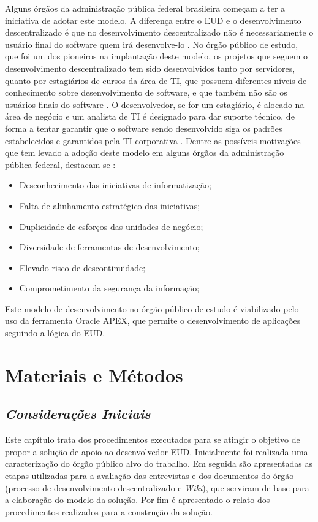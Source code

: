  Alguns órgãos da administração pública federal brasileira começam a ter a iniciativa de adotar este modelo. A diferença entre o EUD e o desenvolvimento descentralizado é que no desenvolvimento descentralizado não é necessariamente o usuário final do software quem irá desenvolve-lo \cite{artigoTcuGovTI}. No órgão público de estudo, que foi um dos pioneiros na implantação deste modelo, os projetos que seguem o desenvolvimento descentralizado tem sido desenvolvidos tanto por servidores, quanto por estagiários de cursos da área de TI, que possuem diferentes níveis de conhecimento sobre desenvolvimento de software, e que também não são os usuários finais do software \cite{artigoTcuGovTI}. O desenvolvedor, se for um estagiário, é alocado na área de negócio e um analista de TI é designado para dar suporte técnico, de forma a tentar garantir que o software sendo desenvolvido siga os padrões estabelecidos e garantidos pela TI corporativa \cite{artigoTcuGovTI}.
Dentre as possíveis motivações que tem levado a adoção deste modelo em alguns órgãos da administração pública federal, destacam-se \cite{slideTCU}:

\begin{itemize}
\item Desconhecimento das iniciativas de informatização;
\item Falta de alinhamento estratégico das iniciativas;
\item Duplicidade de esforços das unidades de negócio;
\item Diversidade de ferramentas de desenvolvimento;
\item Elevado risco de descontinuidade;
\item Comprometimento da segurança da informação;
\end{itemize}

Este modelo de desenvolvimento no órgão público de estudo é viabilizado pelo uso da ferramenta Oracle APEX, que permite o desenvolvimento de aplicações seguindo a lógica do EUD.
\clearpage

\chapter[Materiais e Métodos]{Materiais e Métodos}

\section{\textit{Considerações Iniciais}}


Este capítulo trata dos procedimentos executados para se atingir o objetivo de propor a solução de apoio ao desenvolvedor EUD. Inicialmente foi realizada uma caracterização do órgão público alvo do trabalho. Em seguida são apresentadas as etapas utilizadas para a avaliação das entrevistas e dos documentos do órgão (processo de desenvolvimento descentralizado e \textit{Wiki}), que serviram de base para a elaboração do modelo da solução. Por fim é apresentado o relato dos procedimentos realizados para a construção da solução.

